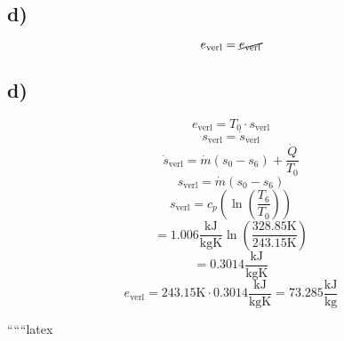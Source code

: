 

\subsection*{d)}
\[
e_{\text{verl}} = \cancel{e_{\text{verl}}}
\]



\subsection*{d)}
\[
e_{\text{verl}} = T_0 \cdot s_{\text{verl}}
\]
\[
s_{\text{verl}} = \dot{s}_{\text{verl}}
\]
\[
\dot{s}_{\text{verl}} = \dot{m} (s_0 - s_6) + \frac{\dot{Q}}{T_0}
\]
\[
s_{\text{verl}} = \dot{m} (s_0 - s_6)
\]
\[
s_{\text{verl}} = c_p \left( \ln \left( \frac{T_6}{T_0} \right) \right)
\]
\[
= 1.006 \frac{\text{kJ}}{\text{kgK}} \ln \left( \frac{328.85 \text{K}}{243.15 \text{K}} \right)
\]
\[
= 0.3014 \frac{\text{kJ}}{\text{kgK}}
\]
\[
e_{\text{verl}} = 243.15 \text{K} \cdot 0.3014 \frac{\text{kJ}}{\text{kgK}} = 73.285 \frac{\text{kJ}}{\text{kg}}
\]

``````latex